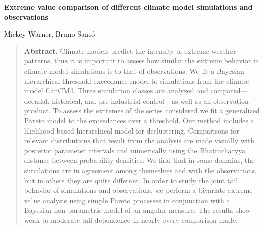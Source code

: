 \begin{Large}
\noindent \textbf{Extreme value comparison of different climate model simulations and observations}
\end{Large}
\bigskip

\noindent Mickey Warner, Bruno Sans{\'o}


\bigskip
\bigskip
\begin{quote}
\textbf{Abstract.}
Climate models predict the intensity of extreme weather patterns, thus it is important to assess how similar the extreme behavior in climate model simulations is to that of observations.
We fit a Bayesian hierarchical threshold exceedance model to simulations from the climate model CanCM4.
Three simulation classes are analyzed and compared---decadal, historical, and pre-industrial control---as well as an observation product. 
To assess the extremes of the series considered we fit a generalized Pareto model to the exceedances over a threshold.
Our method includes a likelihood-based hierarchical model for declustering.
Comparisons for relevant distributions that result from the analysis are made visually with posterior parameter intervals and numerically using the Bhattacharyya distance between probability densities.
We find that in some domains, the simulations are in agreement among themselves and with the observations, but in others they are quite different.
In order to study the joint tail behavior of simulations and observations, we perform a bivariate extreme value analysis using simple Pareto processes in conjunction with a Bayesian non-parametric model of an angular measure.
The results show weak to moderate tail dependence in nearly every comparison made.
\end{quote}



